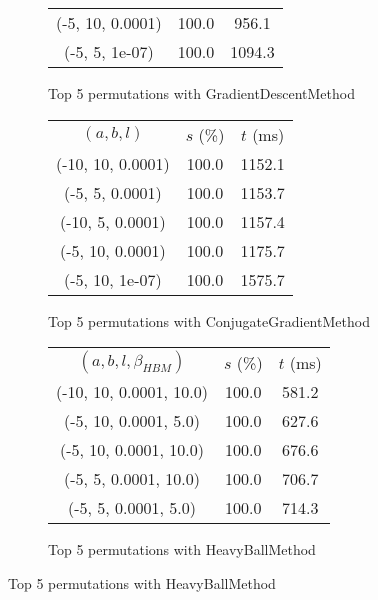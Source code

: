 \begin{figure}[H]
\begin{subfigure}[ht]{.5\textwidth}
\begin{tabular}{|c|c|c|}
(-5, 10, 0.0001) & 100.0 & 956.1 \\
(-5, 5, 1e-07) & 100.0 & 1094.3 \\
\hline
\end{tabular}
\caption{Top 5 permutations with GradientDescentMethod}
\label{subfig:param_comp_MatrixSquareSum_GradientDescentMethod_BisectionSearch}
\end{subfigure}
\hfill
\begin{subfigure}[ht]{.5\textwidth}
\begin{tabular}{|c|c|c|}
\hline
\rowcolor{gray!25}
\multicolumn{3}{|c|}{ConjugateGradientMethod} \\
\hline
\rowcolor{gray!25}
$(a,b,l)$ & $s$ (\%) & $t$ (ms) \\
\hline
(-10, 10, 0.0001) & 100.0 & 1152.1 \\
(-5, 5, 0.0001) & 100.0 & 1153.7 \\
(-10, 5, 0.0001) & 100.0 & 1157.4 \\
(-5, 10, 0.0001) & 100.0 & 1175.7 \\
(-5, 10, 1e-07) & 100.0 & 1575.7 \\
\hline
\end{tabular}
\caption{Top 5 permutations with ConjugateGradientMethod}
\label{subfig:param_comp_MatrixSquareSum_ConjugateGradientMethod_BisectionSearch}
\end{subfigure}
\hfill
\begin{subfigure}[ht]{.5\textwidth}
\begin{tabular}{|c|c|c|}
\hline
\rowcolor{gray!25}
\multicolumn{3}{|c|}{HeavyBallMethod} \\
\hline
\rowcolor{gray!25}
$(a,b,l,\beta_{HBM})$ & $s$ (\%) & $t$ (ms) \\
\hline
(-10, 10, 0.0001, 10.0) & 100.0 & 581.2 \\
(-5, 10, 0.0001, 5.0) & 100.0 & 627.6 \\
(-5, 10, 0.0001, 10.0) & 100.0 & 676.6 \\
(-5, 5, 0.0001, 10.0) & 100.0 & 706.7 \\
(-5, 5, 0.0001, 5.0) & 100.0 & 714.3 \\
\hline
\end{tabular}
\caption{Top 5 permutations with HeavyBallMethod}
\label{subfig:param_comp_MatrixSquareSum_HeavyBallMethod_BisectionSearch}
\end{subfigure}
\end{figure}

